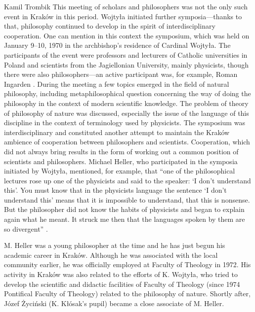 \begin{artengenv}{Kamil Trombik}
This meeting of scholars and philosophers was not the only such event in Kraków in this period. Wojtyła initiated further
symposia---thanks to that, philosophy continued to develop in the spirit of interdisciplinary cooperation. One can
mention in this context the symposium, which was held on January 9--10, 1970 in the archbishop's residence of Cardinal
Wojtyła. The participants of the event were professors and lecturers of Catholic universities in Poland and scientists
from the Jagiellonian University, mainly physicists, though there were also philosophers---an active participant was, for
example, Roman Ingarden
\parencite{heller_poczatki_2006}.
During the meeting a few topics emerged in
the field of natural philosophy, including metaphilosophical question concerning the way of doing the philosophy in the
context of modern scientific knowledge. The problem of theory of philosophy of nature was discussed, especially the
issue of the language of this discipline in the context of terminology used by physicists. The symposium was
interdisciplinary and constituted another attempt to maintain the Kraków ambience of cooperation between philosophers
and scientists. Cooperation, which did not always bring results in the form of working out a common position of
scientists and philosophers. Michael Heller, who participated in the symposia initiated by Wojtyła, mentioned, for
example, that ``one of the philosophical lectures rose up one of the physicists and said to the speaker: `I don't
understand this'. You must know that in the physicists language the sentence `I don't understand this' means that it is
impossible to understand, that this is nonsense. But the philosopher did not know the habits of physicists and began to
explain again what he meant. It struck me then that the languages spoken by them are so
divergent''
\parencite[pp.227--228]{heller_wierze_2016}.

M. Heller was a young philosopher at the time and he has just begun his academic career in Kraków. Although he was
associated with the local community earlier, he was officially employed at Faculty of Theology in 1972. His activity in
Kraków was also related to the efforts of K. Wojtyła, who tried to develop the scientific and didactic facilities of
Faculty of Theology (since 1974 Pontifical Faculty of Theology) related to the philosophy of nature. Shortly after,
Józef Życiński (K. Kłósak's pupil) became a close associate of M. Heller.


\end{artengenv}
